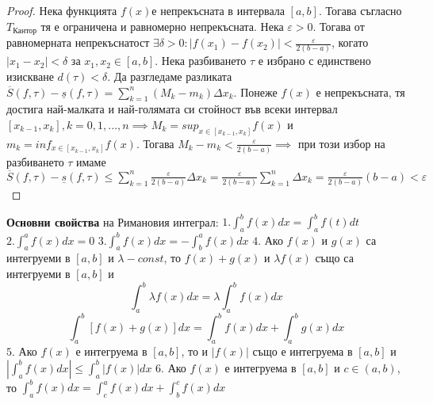 \documentclass{article}
\begin{document}
\begin{proof}
Нека функцията $f(x)$е непрекъсната в интервала $[a, b]$. Тогава съгласно $T_{\text{Кантор}}$ тя е ограничена и равномерно
непрекъсната. Нека $\varepsilon > 0$. Тогава от равномерната непрекъснатост $\exists \delta > 0: |f(x_1) - f(x_2)| <
\frac{\varepsilon}{2(b - a)}$, когато $|x_1 - x_2| < \delta$ за $x_1, x_2 \in [a, b]$. Нека разбиването $\tau$ е избрано с
единствено изискване $d(\tau) < \delta$. \newline Да разгледаме разликата $\overline{S}(f, \tau) - \underline{s}(f, \tau) = \sum_{k = 1}
^{n}(M_k - m_k)\Delta x_k$. Понеже $f(x)$ е непрекъсната, тя достига най-малката и най-голямата си стойност във всеки интервал
$[x_{k - 1}, x_k], k = 0, 1, ..., n \implies M_k = sup_{x \in [x_{k - 1}, x_k]}f(x)$ и $m_k = inf_{x \in [x_{k - 1}, x_k]}f(x)$.
Тогава $M_k - m_k < \frac{\varepsilon}{2(b - a)} \implies$ при този избор на разбиването $\tau$ имаме $\overline{S}(f, \tau) -
\underline{s}(f, \tau) \leq \sum_{k = 1}^{n}\frac{\varepsilon}{2(b - a)}\Delta x_k = \frac{\varepsilon}{2(b - a)}\sum_{k = 1}^
{n}\Delta x_k = \frac{\varepsilon}{2(b - a)}(b - a) < \varepsilon$ 
\end{proof}
\textbf{Основни свойства} на Римановия интеграл: \newline\newline
$1. \int_{a}^{b} f(x)dx = \int_{a}^{b} f(t)dt$ \newline\newline
$2. \int_{a}^{a} f(x)dx = 0$ \newline\newline
$3. \int_{a}^{b} f(x)dx = -\int_{b}^{a} f(x)dx$ \newline\newline
$4.$ Ако $f(x)$ и $g(x)$ са интегруеми в $[a, b]$ и $\lambda - const$, то $f(x) + g(x)$ и $\lambda f(x)$ също са интегруеми в
$[a, b]$ и $$\int_{a}^{b} \lambda f(x)dx = \lambda \int_{a}^{b} f(x)dx$$ $$\int_{a}^{b} [f(x) + g(x)]dx = \int_{a}^{b} f(x)dx +
\int_{a}^{b} g(x)dx$$ \newline\newline
$5.$ Ако $f(x)$ е интегруема в $[a, b]$, то и $|f(x)|$ също е интегруема в $[a, b]$ и $|\int_{a}^{b} f(x)dx| \leq \int_{a}^{b}
|f(x)|dx$ \newline\newline
$6.$ Ако $f(x)$ е интегруема в $[a, b]$ и $c \in (a, b)$, то $\int_{a}^{b} f(x)dx = \int_{c}^{a} f(x)dx + \int_{b}^{c} f(x)dx$ \newline\newline
\end{document}
